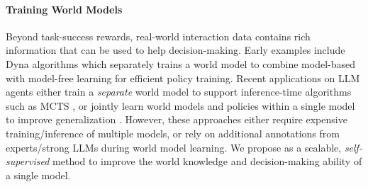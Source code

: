\paragraph{Training World Models}
Beyond task-success rewards, real-world interaction data contains rich information that can be used to help decision-making.
Early examples include Dyna algorithms \citep{dyna} which separately trains a world model to combine model-based with model-free learning for efficient policy training.
Recent applications on LLM agents either train a \emph{separate} world model to support inference-time algorithms such as MCTS \citep{hao2023reasoninglanguagemodelplanning,wu2025rlvrworldtrainingworldmodels,chae2025webagentsworldmodels,gu2025llmsecretlyworldmodel}, or jointly learn world models and policies within a single model to improve generalization \citep{faircodegenteam2025cwmopenweightsllmresearch,zhang2025agentlearningearlyexperience,yu2025dynamindlearningsimulateexperience,yu2025dynathinksynergizingreasoningacting,feng2025webworldmodels,li2025wordworldlargelanguage,qian2026current}.
However, these approaches either require expensive training/inference of multiple models, or rely on additional annotations from experts/strong LLMs during world model learning.
We propose \wmrlshort{} as a scalable, \emph{self-supervised} method to improve the world knowledge and decision-making ability of a single model.